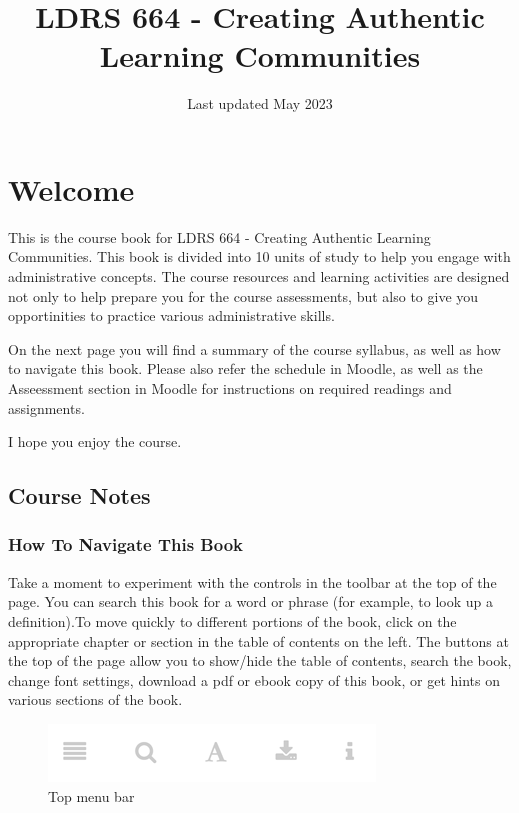 \documentclass[
]{book}
\title{LDRS 664 - Creating Authentic Learning Communities}
\author{}
\date{\vspace{-2.5em}Last updated May 2023}
\begin{document}
\maketitle

{
\setcounter{tocdepth}{1}
\tableofcontents
}
\hypertarget{welcome}{%
\chapter*{Welcome}\label{welcome}}

This is the course book for LDRS 664 - Creating Authentic Learning Communities. This book is divided into 10 units of study to help you engage with administrative concepts. The course resources and learning activities are designed not only to help prepare you for the course assessments, but also to give you opportinities to practice various administrative skills.

On the next page you will find a summary of the course syllabus, as well as how to navigate this book. Please also refer the schedule in Moodle, as well as the Asseessment section in Moodle for instructions on required readings and assignments.

I hope you enjoy the course.

\hypertarget{course-notes}{%
\section*{Course Notes}\label{course-notes}}

\hypertarget{how-to-navigate-this-book}{%
\subsection*{How To Navigate This Book}\label{how-to-navigate-this-book}}

Take a moment to experiment with the controls in the toolbar at the top of the page. You can search this book for a word or phrase (for example, to look up a definition).To move quickly to different portions of the book, click on the appropriate chapter or section in the table of contents on the left. The buttons at the top of the page allow you to show/hide the table of contents, search the book, change font settings, download a pdf or ebook copy of this book, or get hints on various sections of the book.

\begin{figure}
\centering
\includegraphics{assets/course-intro/menu.png}
\caption{\label{fig:unnamed-chunk-1}Top menu bar}
\end{figure}
\end{document}
